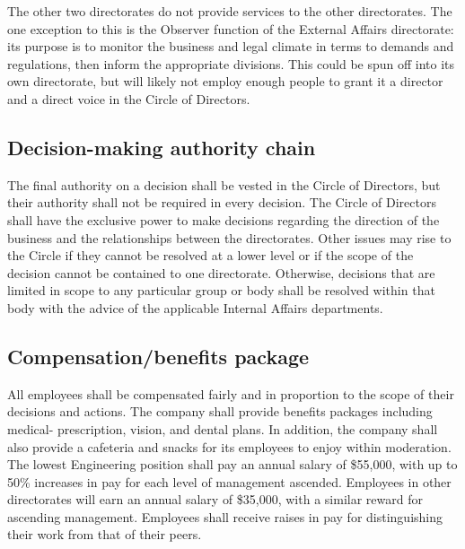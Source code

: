 \documentclass[11pt,letterpaper]{article}
\begin{document}
The other two directorates do not provide services to the other directorates. The one exception to this is the Observer function of the External Affairs directorate: its purpose is to monitor the business and legal climate in terms to demands and regulations, then inform the appropriate divisions. This could be spun off into its own directorate, but will likely not employ enough people to grant it a director and a direct voice in the Circle of Directors.

\subsection{Decision-making authority chain}
The final authority on a decision shall be vested in the Circle of Directors, but their authority shall not be required in every decision. The Circle of Directors shall have the exclusive power to make decisions regarding the direction of the business and the relationships between the directorates. Other issues may rise to the Circle if they cannot be resolved at a lower level or if the scope of the decision cannot be contained to one directorate. Otherwise, decisions that are limited in scope to any particular group or body shall be resolved within that body with the advice of the applicable Internal Affairs departments.



\subsection{Compensation/benefits package}
All employees shall be compensated fairly and in proportion to the scope of their decisions and actions. The company shall provide benefits packages including medical- prescription, vision, and dental plans. In addition, the company shall also provide a cafeteria and snacks for its employees to enjoy within moderation. The lowest Engineering position shall pay an annual salary of \$55,000, with up to 50\% increases in pay for each level of management ascended. Employees in other directorates will earn an annual salary of \$35,000, with a similar reward for ascending management. Employees shall receive raises in pay for distinguishing their work from that of their peers.
\end{document}
